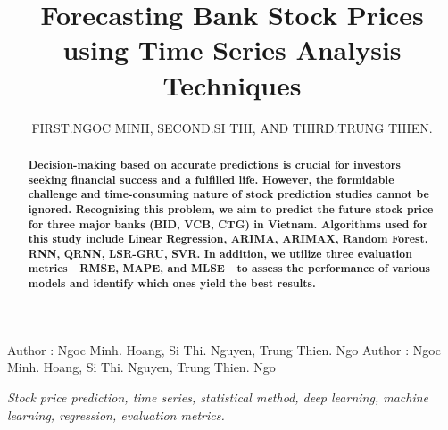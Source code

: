 \documentclass{ieeeojies}
\begin{document}
\title{Forecasting Bank Stock Prices using Time Series Analysis Techniques}

\author{\uppercase{First.Ngoc Minh},
\uppercase{Second.Si Thi, and Third.Trung Thien}.
}
\address[1]{Hoang Ngoc Minh, University of Information Technology
Ho Chi Minh City, Vietnam
 (e-mail: 21522335@gm.uit.edu.vn)}
\address[2]{Nguyen Si Thi, University of Information Technology
Ho Chi Minh City, Vietnam
 (e-mail: 21522615@gm.uit.edu.vn)}
\address[3]{Ngo Trung Thien, University of Information Technology
Ho Chi Minh City, Vietnam
 (e-mail: 21522624@gm.uit.edu.vn)}

\markboth
{Author \headeretal: Ngoc Minh. Hoang, Si Thi. Nguyen, Trung Thien. Ngo}
{Author \headeretal: Ngoc Minh. Hoang, Si Thi. Nguyen, Trung Thien. Ngo}

\begin{abstract}
\textbf{Decision-making based on accurate predictions is crucial for investors seeking financial success and a fulfilled life. However, the formidable challenge and time-consuming nature of stock prediction studies cannot be ignored.  Recognizing this problem, we aim to predict the future stock price for three major banks (BID, VCB, CTG) in Vietnam. Algorithms used for this study include Linear Regression, ARIMA, ARIMAX, Random Forest, RNN, QRNN, LSR-GRU, SVR. In addition, we utilize three evaluation metrics—RMSE, MAPE, and MLSE—to assess the performance of various models and identify which ones yield the best results.}
\end{abstract}

\begin{keywords}
\textit{Stock price prediction, time series, statistical method, deep learning, machine learning, regression, evaluation metrics.}

\end{keywords}

\titlepgskip=-15pt

\maketitle
\end{document}
